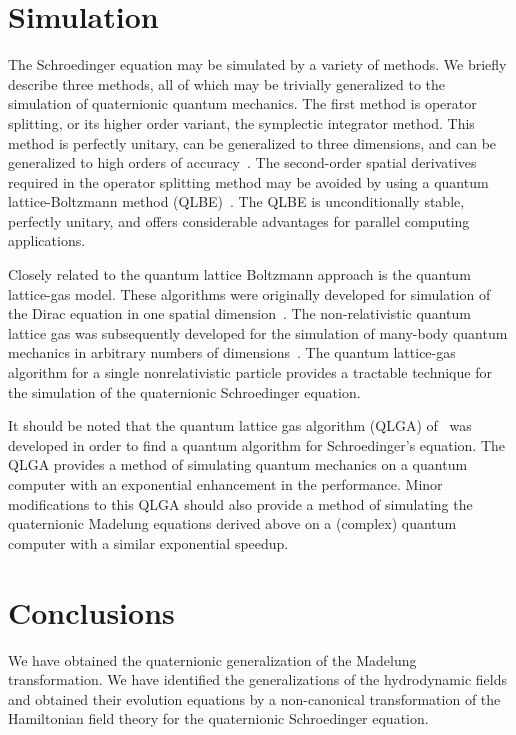 \documentclass[a4paper,aps,prd,preprint,groupedaddress]{revtex4}
\begin{document}
\section{Simulation}

The Schroedinger equation may be simulated by a variety of methods. We briefly describe three methods, all of which may be trivially generalized to the simulation of quaternionic quantum mechanics.  The first method is operator splitting, or its higher order variant, the symplectic integrator method.  This method is perfectly unitary, can be generalized to three dimensions, and can be generalized to high orders of accuracy~\cite{bib:opsplit1,bib:opsplit2,bib:opsplit3,bib:opsplit4,bib:opsplit5,bib:opsplit6}. The second-order spatial derivatives required in the operator splitting method may be avoided by using a quantum lattice-Boltzmann method (QLBE)~\cite{bib:qlbe1,bib:qlbe2, bib:qlbe3}. The QLBE is unconditionally stable, perfectly unitary, and offers considerable advantages for parallel computing applications. 

Closely related to the quantum lattice Boltzmann approach is the quantum lattice-gas model. These algorithms were originally developed for simulation of the Dirac equation in one spatial dimension~\cite{bib:meyer1,bib:meyer2,bib:meyer3,bib:meyer4}. The non-relativistic quantum lattice gas was subsequently developed for the simulation of many-body quantum mechanics in arbitrary numbers of dimensions~\cite{bib:bogwash}. The quantum lattice-gas algorithm for a single nonrelativistic particle provides a tractable technique for the simulation of the quaternionic Schroedinger equation.

It should be noted that the quantum lattice gas algorithm (QLGA) of~\cite{bib:bogwash} was developed in order to find a quantum algorithm for Schroedinger's equation. The QLGA provides a method of simulating quantum mechanics on a quantum computer with an exponential enhancement in the performance. Minor modifications to this QLGA should also provide a method of simulating the quaternionic Madelung equations derived above on a (complex) quantum computer with a similar exponential speedup.

\section{Conclusions}

We have obtained the quaternionic generalization of the Madelung transformation. We have identified the generalizations of the hydrodynamic  fields and obtained their evolution equations by a non-canonical transformation of the Hamiltonian field theory for the quaternionic Schroedinger equation. 
\end{document}
